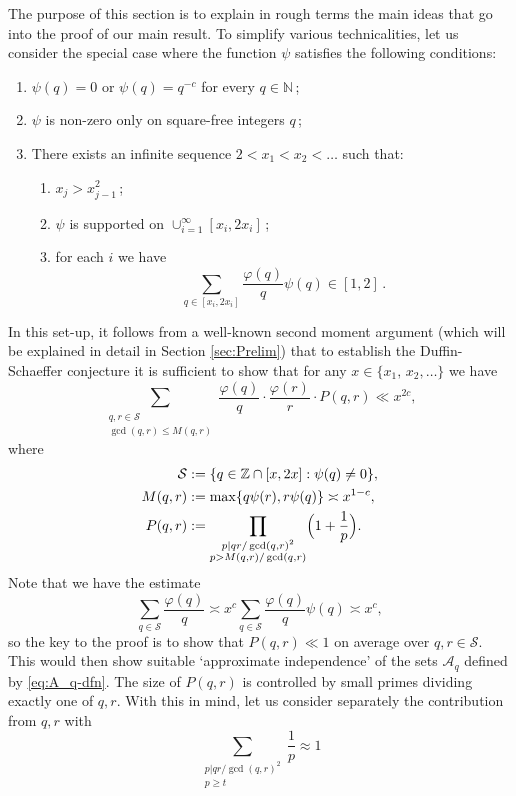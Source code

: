 \documentclass[12pt]{amsart}
\numberwithin{equation}{section}
\theoremstyle{definition}
\theoremstyle{remark}
\newcommand{\Z}{\mathbb{Z}}
\newcommand{\CA}{\mathcal{A}}
\newcommand{\CS}{\mathcal{S}}
\renewcommand{\phi}{\varphi}
\renewcommand{\le}{\leqslant}
\renewcommand{\ge}{\geqslant}
\begin{document}
The purpose of this section is to explain in rough terms the main ideas that go into the proof of our main result. To simplify various technicalities, let us consider the special case where the function $\psi$ satisfies the following conditions:
\begin{enumerate}
\item $\psi(q)=0$ or $\psi(q)=q^{-c}$ for every $q\in\mathbb{N}$\,;
\item $\psi$ is non-zero only on square-free integers $q$\,;
\item There exists an infinite sequence $2<x_1<x_2<\dots$ such that:
\begin{enumerate}
\item $x_j>x_{j-1}^2$\,;
\item $\psi$ is supported on $\cup_{i=1}^{\infty}[x_i,2x_i]$\,;
\item for each $i$ we have
\[
\sum_{q\in [x_i,2x_i]}\frac{\phi(q)}{q}\psi(q)\in[1,2]  \,.
\]
\end{enumerate}
\end{enumerate}
In this set-up, it follows from a well-known second moment argument (which will be explained in detail in Section \ref{sec:Prelim}) that to establish the Duffin-Schaeffer conjecture it is sufficient to show that for any $x\in \{x_1,\,x_2,\dots\}$ we have
\[
\sum_{\substack{q,r\in\CS\\\gcd(q,r)\le M(q,r)}}\frac{\phi(q)}{q}\cdot \frac{\phi(r)}{r}\cdot P(q,r)\ll x^{2c},
\]
where 
\begin{align*}
\CS&:=\{q\in\Z\cap[x,2x] : \psi(q)\neq0\},\\
M(q,r)&:=\max\{q\psi(r),r\psi(q)\}\asymp x^{1-c},\\
P(q,r)&:=\prod_{\substack{p|qr/\gcd(q,r)^2\\ p>M(q,r)/\gcd(q,r)}}\Bigl(1+\frac{1}{p}\Bigr).
\end{align*}
Note that we have the estimate
\[
\sum_{q\in \CS}\frac{\phi(q)}{q}\asymp x^{c}\sum_{q\in\CS}\frac{\phi(q)}{q}\psi(q)\asymp x^{c} ,
\]
so the key to the proof is to show that $P(q,r)\ll 1$ on average over $q,r\in\CS$. This would then show suitable `approximate independence' of the sets $\CA_q$ defined by  \eqref{eq:A_q-dfn}. The size of $P(q,r)$ is controlled by small primes dividing exactly one of $q,r$. With this in mind, let us consider separately the contribution from $q,r$ with
\begin{equation}
\sum_{\substack{p|qr/\gcd(q,r)^2\\ p\ge t}}\frac{1}{p}\approx 1
\label{eq:tThreshold}
\end{equation}
\end{document}
